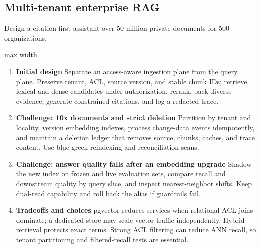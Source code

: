 \subsection{Multi-tenant enterprise RAG}
Design a citation-first assistant over 50 million private documents for 500 organizations.
\begin{center}\begin{adjustbox}{max width=\linewidth}\end{adjustbox}\end{center}
\begin{enumerate}
\item \textbf{Initial design} Separate an access-aware ingestion plane from the query plane. Preserve tenant, ACL, source version, and stable chunk IDs; retrieve lexical and dense candidates under authorization, rerank, pack diverse evidence, generate constrained citations, and log a redacted trace.
\item \textbf{Challenge: 10x documents and strict deletion} Partition by tenant and locality, version embedding indexes, process change-data events idempotently, and maintain a deletion ledger that removes source, chunks, caches, and trace content. Use blue-green reindexing and reconciliation scans.
\item \textbf{Challenge: answer quality falls after an embedding upgrade} Shadow the new index on frozen and live evaluation sets, compare recall and downstream quality by query slice, and inspect nearest-neighbor shifts. Keep dual-read capability and roll back the alias if guardrails fail.
\item \textbf{Tradeoffs and choices} pgvector reduces services when relational ACL joins dominate; a dedicated store may scale vector traffic independently. Hybrid retrieval protects exact terms. Strong ACL filtering can reduce ANN recall, so tenant partitioning and filtered-recall tests are essential.
\end{enumerate}
